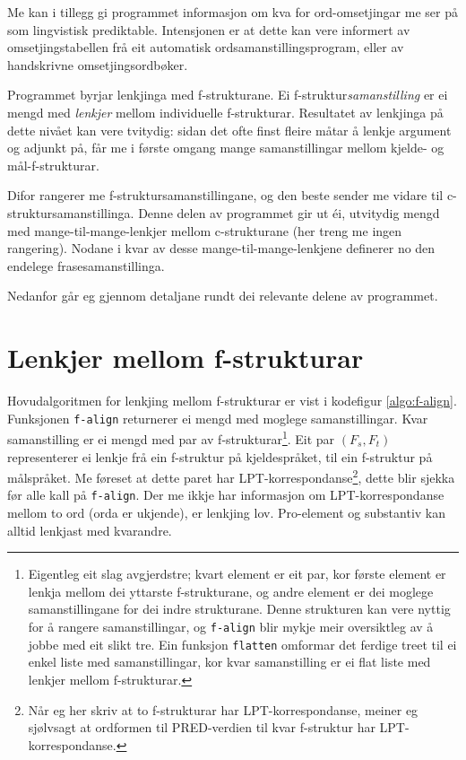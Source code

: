 \documentclass[11pt,a4paper,oneside,draft]{book}
\begin{document}
Me kan i tillegg gi programmet informasjon om kva for ord-omsetjingar
me ser på som lingvistisk prediktable. Intensjonen er at dette kan
vere informert av omsetjingstabellen frå eit automatisk
ordsamanstillingsprogram, eller av handskrivne omsetjingsordbøker.

Programmet byrjar lenkjinga med f-strukturane. Ei
f-struktur\emph{samanstilling} er ei mengd med \emph{lenkjer} mellom
individuelle f-strukturar. Resultatet av lenkjinga på dette nivået kan
vere tvitydig: sidan det ofte finst fleire måtar å lenkje argument og
adjunkt på, får me i første omgang mange samanstillingar mellom
kjelde- og mål-f-strukturar.

Difor rangerer me f-struktursamanstillingane, og den beste sender me
vidare til c-struktursamanstillinga. Denne delen av programmet gir ut
éi, utvitydig mengd med mange-til-mange-lenkjer mellom c-strukturane
(her treng me ingen rangering). Nodane i kvar av desse
mange-til-mange-lenkjene definerer no den endelege
frasesamanstillinga.

Nedanfor går eg gjennom detaljane rundt dei relevante delene av
programmet.

\section{Lenkjer mellom f-strukturar}
\label{sec-4.1}

\label{SEC:impl-f-lenkjing}

Hovudalgoritmen for lenkjing mellom f-strukturar er vist i kodefigur
\ref{algo:f-align}. Funksjonen \texttt{f-align} returnerer ei mengd med
moglege samanstillingar. Kvar samanstilling er ei mengd med par av
f-strukturar\footnote{Eigentleg eit slag avgjerdstre; kvart element er eit par, kor
        første element er lenkja mellom dei yttarste f-strukturane, og
        andre element er dei moglege samanstillingane for dei indre
        strukturane. Denne strukturen kan vere nyttig for å rangere
        samanstillingar, og \texttt{f-align} blir mykje meir oversiktleg av å
        jobbe med eit slikt tre. Ein funksjon \texttt{flatten} omformar det
        ferdige treet til ei enkel liste med samanstillingar, kor kvar
        samanstilling er ei flat liste med lenkjer mellom
        f-strukturar. }. Eit par $(F_s,F_t)$ representerer ei lenkje frå
ein f-struktur på kjeldespråket, til ein f-struktur på målspråket. Me
føreset at dette paret har LPT-korrespondanse\footnote{Når eg her skriv at to f-strukturar har LPT-korrespondanse,
        meiner eg sjølvsagt at ordformen til PRED-verdien til kvar
        f-struktur har LPT-korrespondanse. }, dette blir
sjekka før alle kall på \texttt{f-align}. Der me ikkje har informasjon om
LPT-korrespondanse mellom to ord (orda er ukjende), er lenkjing
lov. Pro-element og substantiv kan alltid lenkjast med kvarandre.
\end{document}
